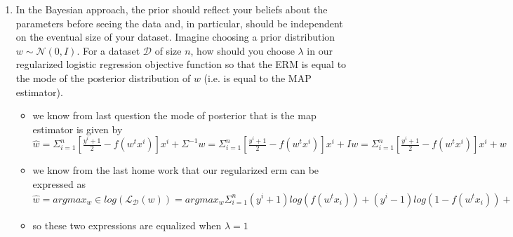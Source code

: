 \documentclass{article}
\theoremstyle{plain}
\theoremstyle{definition}
\begin{document}
\begin{enumerate}
\item In the Bayesian approach, the prior should reflect your beliefs about
the parameters before seeing the data and, in particular, should be
independent on the eventual size of your dataset. Imagine choosing a prior distribution $w\sim\mathcal{N}(0,I)$. For a dataset $\mathcal{D}$
of size $n$, how should you choose $\lambda$ in our regularized
logistic regression objective function so that the ERM is equal
to the mode of the posterior distribution of $w$ (i.e. is equal to
the MAP estimator). 
\begin{itemize}
    \color{blue}
    \item we know from last question the mode of posterior that is the map estimator is given by $\hat{w}=\Sigma_{i=1}^{n}[\frac{y^i+1}{2}-f(w^tx^i)]x^{i}+\Sigma^{-1}w=\Sigma_{i=1}^{n}[\frac{y^i+1}{2}-f(w^tx^i)]x^{i}+Iw=\Sigma_{i=1}^{n}[\frac{y^i+1}{2}-f(w^tx^i)]x^{i}+w$
    \item we know from the last home work that our regularized erm can be expressed as  $\hat{w}=argmax_{w}\in log(\mathcal{L}_{\mathcal{D}}(w))=argmax_{w}\Sigma_{i=1}^{n}(y^i+1)log(f(w^tx_i))+(y^i-1)log(1-f(w^tx_i))+\lambda ||w||=\Sigma_{i=1}^{n}[\frac{y^i+1}{2}-f(w^tx^i)]x^{i}+\lambda w$ 
    \item so these two expressions are equalized when $\lambda=1$
\end{itemize}



\setcounter{saveenum}{\value{enumi}}
\end{enumerate}
\end{document}
